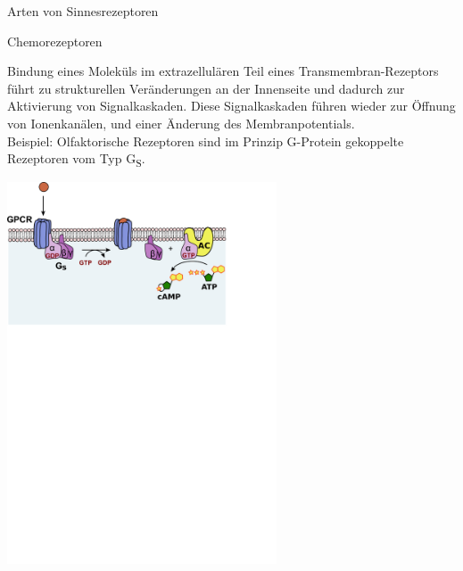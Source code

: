 \documentclass{beamer}
\begin{document}
\begin{frame}{Arten von Sinnesrezeptoren}


\begin{block}{Chemorezeptoren}

Bindung eines Moleküls im extrazellulären Teil eines Transmembran-Rezeptors führt zu strukturellen Veränderungen an der Innenseite und dadurch zur Aktivierung von Signalkaskaden. Diese Signalkaskaden führen wieder zur Öffnung von Ionenkanälen, und einer Änderung des Membranpotentials.   \\

Beispiel: Olfaktorische Rezeptoren sind im Prinzip G-Protein gekoppelte Rezeptoren vom Typ G\textsubscript{S}. 


\end{block}

\begin{center}
    \includegraphics[width=0.6\textwidth]{GPCR_Gs_pathway.png}
\end{center}


\end{frame}
\end{document}
